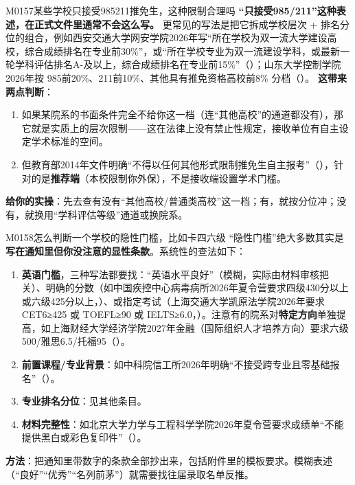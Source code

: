 \begin{qa}{M0157}{某些学校只接受985211推免生，这种限制合理吗}
\textbf{“只接受985/211”这种表述，在正式文件里通常不会这么写。} 更常见的写法是把它拆成学校层次 + 排名分位的组合，例如西安交通大学网安学院2026年写“所在学校为双一流大学建设高校，综合成绩排名在专业前30\%”，或“所在学校专业为双一流建设学科，或最新一轮学科评估排名A-及以上，综合成绩排名在专业前15\%”（）；山东大学控制学院2026年按 985前20\%、211前10\%、其他具有推免资格高校前8\% 分档（）。
\textbf{这带来两点判断}：
\begin{enumerate}
  \item 如果某院系的书面条件完全不给你这一档（连“其他高校”的通道都没有），那它就是实质上的层次限制——这在法律上没有禁止性规定，接收单位有自主设定学术标准的空间。
  \item 但教育部2014年文件明确“不得以任何其他形式限制推免生自主报考”（），针对的是\textbf{推荐端}（本校限制你外保），不是接收端设置学术门槛。
\end{enumerate}
\textbf{给你的实操}：先去查有没有“其他高校/普通类高校”这一档；有，就按分位冲；没有，就换用“学科评估等级”通道或换院系。
\end{qa}

\begin{qa}{M0158}{怎么判断一个学校的隐性门槛，比如卡四六级}
“隐性门槛”绝大多数其实是\textbf{写在通知里但你没注意的显性条款}。系统性的查法如下：
\begin{enumerate}
  \item \textbf{英语门槛}，三种写法都要找：“英语水平良好”（模糊，实际由材料审核把关）、明确的分数（如中国疾控中心病毒病所2026年夏令营要求四级430分以上或六级425分以上，）、或指定考试（上海交通大学凯原法学院2026年要求 CET6≥425 或 TOEFL≥90 或 IELTS≥6.0，）。注意有的院系对\textbf{特定方向}单独提高，如上海财经大学经济学院2027年金融（国际组织人才培养方向）要求六级500/雅思6.5/托福95（）。
  \item \textbf{前置课程/专业背景}：如中科院信工所2026年明确“不接受跨专业且零基础报名”（）。
  \item \textbf{专业排名分位}：见其他条目。
  \item \textbf{材料完整性}：如北京大学力学与工程科学学院2026年夏令营要求成绩单“不能提供黑白或彩色复印件”（）。
\end{enumerate}
\textbf{方法}：把通知里带数字的条款全部抄出来，包括附件里的模板要求。模糊表述（“良好”“优秀”“名列前茅”）就需要找往届录取名单反推。
\end{qa}

